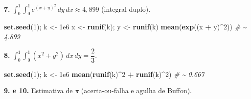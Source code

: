 \documentclass[
  portuguese,
  11pt,
  openany]{book}
\newenvironment{Shaded}{\begin{snugshade}}{\end{snugshade}}
\newcommand{\CommentTok}[1]{\textcolor[rgb]{0.56,0.35,0.01}{\textit{#1}}}
\newcommand{\DecValTok}[1]{\textcolor[rgb]{0.00,0.00,0.81}{#1}}
\newcommand{\FloatTok}[1]{\textcolor[rgb]{0.00,0.00,0.81}{#1}}
\newcommand{\FunctionTok}[1]{\textcolor[rgb]{0.13,0.29,0.53}{\textbf{#1}}}
\newcommand{\NormalTok}[1]{#1}
\newcommand{\OtherTok}[1]{\textcolor[rgb]{0.56,0.35,0.01}{#1}}
\newcommand{\SpecialCharTok}[1]{\textcolor[rgb]{0.81,0.36,0.00}{\textbf{#1}}}
\begin{document}
\textbf{7.} \(\int_0^1\!\int_0^1 e^{(x+y)^2}\,dy\,dx \approx 4{,}899\) (integral duplo).

\begin{Shaded}
\begin{Highlighting}[]
\FunctionTok{set.seed}\NormalTok{(}\DecValTok{1}\NormalTok{); k }\OtherTok{\textless{}{-}} \FloatTok{1e6}
\NormalTok{x }\OtherTok{\textless{}{-}} \FunctionTok{runif}\NormalTok{(k); y }\OtherTok{\textless{}{-}} \FunctionTok{runif}\NormalTok{(k)}
\FunctionTok{mean}\NormalTok{(}\FunctionTok{exp}\NormalTok{((x }\SpecialCharTok{+}\NormalTok{ y)}\SpecialCharTok{\^{}}\DecValTok{2}\NormalTok{))       }\CommentTok{\# \textasciitilde{} 4.899}
\end{Highlighting}
\end{Shaded}

\textbf{8.} \(\int_0^1\!\int_0^1 (x^2 + y^2)\,dx\,dy = \dfrac23\).

\begin{Shaded}
\begin{Highlighting}[]
\FunctionTok{set.seed}\NormalTok{(}\DecValTok{1}\NormalTok{); k }\OtherTok{\textless{}{-}} \FloatTok{1e6}
\FunctionTok{mean}\NormalTok{(}\FunctionTok{runif}\NormalTok{(k)}\SpecialCharTok{\^{}}\DecValTok{2} \SpecialCharTok{+} \FunctionTok{runif}\NormalTok{(k)}\SpecialCharTok{\^{}}\DecValTok{2}\NormalTok{)   }\CommentTok{\# \textasciitilde{} 0.667}
\end{Highlighting}
\end{Shaded}

\textbf{9. e 10.} Estimativa de \(\pi\) (acerta-ou-falha e agulha de Buffon).
\end{document}
